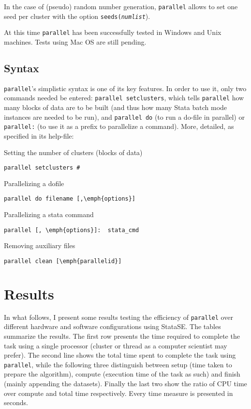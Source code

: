 \documentclass[letterpaper, 10pt]{article}
\begin{document}
In the case of (pseudo) random number generation, {\tt parallel} allows to set one seed per cluster with the option {\tt seeds(\it{numlist}}).

At this time {\tt parallel} has been successfully tested in Windows and Unix machines. Tests using Mac OS are still pending.

\subsection{Syntax}

{\tt parallel}'s simplistic syntax is one of its key features. In order to use it, only two commands needed be entered: {\tt parallel setclusters}, which tells {\tt parallel} how many blocks of data are to be built (and thus how many Stata batch mode instances are needed to be run), and {\tt parallel do} (to run a do-file in parallel) or {\tt parallel:} (to use it as a prefix to parallelize a command). More, detailed, as specified in its help-file:

Setting the number of clusters (blocks of data)

\begin{verbatim}
parallel setclusters #
\end{verbatim}

Parallelizing a dofile

\begin{Verbatim}[commandchars=\\\{\}]
parallel do filename [,\emph{options}]
\end{Verbatim}

Parallelizing a stata command

\begin{Verbatim}[commandchars=\\\{\}]
parallel [, \emph{options}]:  stata_cmd
\end{Verbatim}

Removing auxiliary files

\begin{Verbatim}[commandchars=\\\{\}]
parallel clean [\emph{parallelid}]
\end{Verbatim}

\section{Results}
\def\win1{Intel Core i5 M560 (dual-core)}
\def\unix1{Intel Xeon X470 (octa-core)}

In what follows, I present some results testing the efficiency of {\tt parallel} over different hardware and software configurations using StataSE. The tables summarize the results. The first row presents the time required to complete the task using a single processor (cluster or thread as a computer scientist may prefer). The second line shows the total time spent to complete the task using {\tt parallel}, while the following three distinguish between setup (time taken to prepare the algorithm), compute (execution time of the task as such) and finish (mainly appending the datasets). Finally the last two show the ratio of CPU time over compute and total time respectively. Every time measure is presented in seconds.
\end{document}
